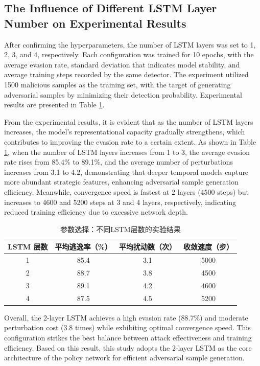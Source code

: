 \subsection{The Influence of Different LSTM Layer Number on Experimental Results}

After confirming the hyperparameters, the number of LSTM layers was set to 1, 2, 3, and 4, respectively. Each configuration was trained for 10 epochs, with the average evasion rate, standard deviation that indicates model stability, and average training steps recorded by the same detector. The experiment utilized 1500 malicious samples as the training set, with the target of generating adversarial samples by minimizing their detection probability. Experimental results are presented in Table \ref{tab:5.6}.  

From the experimental results, it is evident that as the number of LSTM layers increases, the model's representational capacity gradually strengthens, which contributes to improving the evasion rate to a certain extent. As shown in Table \ref{tab:5.6}, when the number of LSTM layers increases from 1 to 3, the average evasion rate rises from 85.4\% to 89.1\%, and the average number of perturbations increases from 3.1 to 4.2, demonstrating that deeper temporal models capture more abundant strategic features, enhancing adversarial sample generation efficiency. Meanwhile, convergence speed is fastest at 2 layers (4500 steps) but increases to 4600 and 5200 steps at 3 and 4 layers, respectively, indicating reduced training efficiency due to excessive network depth.

\begin{table}[htbp]
	\centering
	\caption{参数选择：不同LSTM层数的实验结果}
	\label{tab:5.6}
	\begin{tabular*}{0.9\textwidth}{@{\extracolsep{\fill}}cccc}
		\toprule
		LSTM 层数 & 平均逃逸率（\%） & 平均扰动数（次） & 收敛速度（步） \\
		\midrule
		1 & 85.4 & 3.1 & 5000 \\
		2 & 88.7 & 3.8 & 4500 \\
		3 & 89.1 & 4.2 & 4600 \\
		4 & 87.5 & 4.5 & 5200 \\
		\bottomrule
	\end{tabular*}
\end{table}

Overall, the 2-layer LSTM achieves a high evasion rate (88.7\%) and moderate perturbation cost (3.8 times) while exhibiting optimal convergence speed. This configuration strikes the best balance between attack effectiveness and training efficiency. Based on this result, this study adopts the 2-layer LSTM as the core architecture of the policy network for efficient adversarial sample generation.

